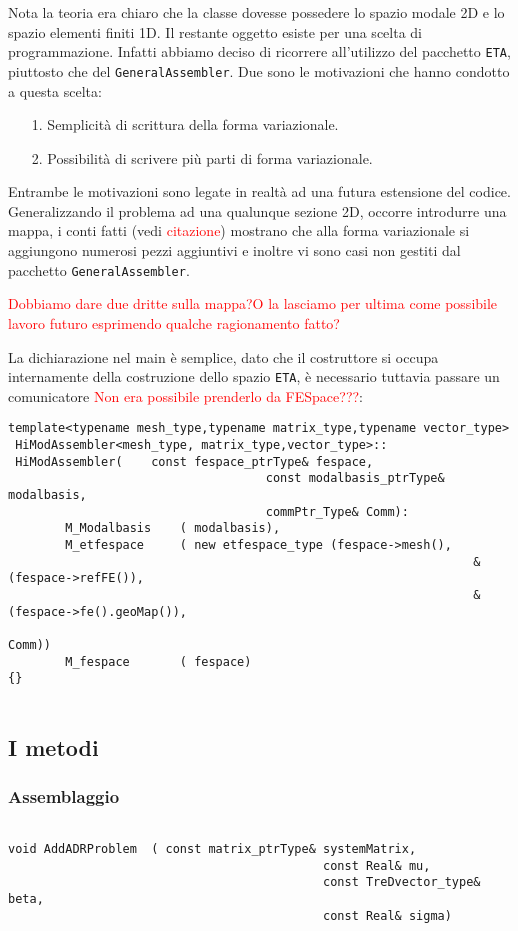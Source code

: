 Nota la teoria era chiaro che la classe dovesse possedere lo spazio modale 2D e lo spazio elementi finiti 1D.
Il restante oggetto esiste per una scelta di programmazione. Infatti abbiamo deciso di ricorrere all'utilizzo del pacchetto \texttt{ETA}, piuttosto che del \texttt{GeneralAssembler}. Due sono le motivazioni che hanno condotto a questa scelta:
\begin{itemize}
\item[1.] Semplicit\`a di scrittura della forma variazionale.
\item[2.] Possibilit\`a di scrivere pi\`u parti di forma variazionale.
\end{itemize}

Entrambe le motivazioni sono legate in realt\`a ad una futura estensione del codice. Generalizzando il problema ad una qualunque sezione 2D, occorre introdurre una mappa, i conti fatti (vedi \textcolor{red}{citazione}) mostrano che alla forma variazionale si aggiungono numerosi pezzi aggiuntivi e inoltre vi sono casi non gestiti dal pacchetto \texttt{GeneralAssembler}.

\textcolor{red}{Dobbiamo dare due dritte sulla mappa?O la lasciamo per ultima come possibile lavoro futuro esprimendo qualche ragionamento fatto?}

La dichiarazione nel main \`e semplice, dato che il costruttore si occupa internamente della costruzione dello spazio \texttt{ETA}, \`e necessario tuttavia passare un comunicatore \textcolor{red}{Non era possibile prenderlo da FESpace???}:

\begin{lstlisting}[style=general]
 template<typename mesh_type,typename matrix_type,typename vector_type>
 HiModAssembler<mesh_type, matrix_type,vector_type>::
 HiModAssembler(	const fespace_ptrType& fespace,
 									const modalbasis_ptrType& modalbasis,
 									commPtr_Type& Comm):
 		M_Modalbasis	( modalbasis),
 		M_etfespace 	( new etfespace_type (fespace->mesh(),
 																 &(fespace->refFE()),
 																 &(fespace->fe().geoMap()),
 																 Comm))
		M_fespace		( fespace)
{} 																 
 																
\end{lstlisting}

\subsection{I metodi}
\subsubsection{Assemblaggio}
\begin{lstlisting}[style=general, frame = top]

void AddADRProblem	( const matrix_ptrType& systemMatrix,
											const Real& mu, 
											const TreDvector_type& beta, 
											const Real& sigma)
\end{lstlisting}

